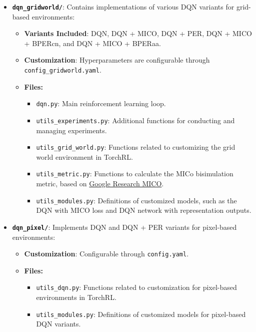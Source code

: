 \begin{itemize}
    \item \textbf{\texttt{dqn\_gridworld/}}: Contains implementations of various DQN variants for grid-based environments:
    \begin{itemize}
        \item \textbf{Variants Included}: DQN, DQN + MICO, DQN + PER, DQN + MICO + BPERcn, and DQN + MICO + BPERaa.
        \item \textbf{Customization}: Hyperparameters are configurable through \texttt{config\_gridworld.yaml}.
        \item \textbf{Files:}
        \begin{itemize}
            \item \texttt{dqn.py}: Main reinforcement learning loop.
            \item \texttt{utils\_experiments.py}: Additional functions for conducting and managing experiments.
            \item \texttt{utils\_grid\_world.py}: Functions related to customizing the grid world environment in TorchRL.
            \item \texttt{utils\_metric.py}: Functions to calculate the MICo bisimulation metric, based on \href{https://github.com/google-research/google-research/blob/master/mico/atari/metric_utils.py}{Google Research MICO}.
            \item \texttt{utils\_modules.py}: Definitions of customized models, such as the DQN with MICO loss and DQN network with representation outputs.
        \end{itemize}
    \end{itemize}

    \item \textbf{\texttt{dqn\_pixel/}}: Implements DQN and DQN + PER variants for pixel-based environments:
    \begin{itemize}
        \item \textbf{Customization}: Configurable through \texttt{config.yaml}.
        \item \textbf{Files:}
        \begin{itemize}
            \item \texttt{utils\_dqn.py}: Functions related to customization for pixel-based environments in TorchRL.
            \item \texttt{utils\_modules.py}: Definitions of customized models for pixel-based DQN variants.
        \end{itemize}
    \end{itemize}


\end{itemize}
